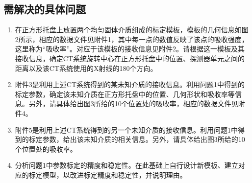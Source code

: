 \documentclass[UTF8]{ctexart}
\begin{document}
\subsection{需解决的具体问题}
\begin{enumerate}
\item 在正方形托盘上放置两个均匀固体介质组成的标定模板，模板的几何信息如图2所示，相应的数据文件见附件1，其中每一点的数值反映了该点的吸收强度，这里称为“吸收率”。对应于该模板的接收信息见附件2。请根据这一模板及其接收信息，确定CT系统旋转中心在正方形托盘中的位置、探测器单元之间的距离以及该CT系统使用的X射线的180个方向。
\item 附件3是利用上述CT系统得到的某未知介质的接收信息。利用问题1中得到的标定参数，确定该未知介质在正方形托盘中的位置、几何形状和吸收率等信息。另外，请具体给出图3所给的10个位置处的吸收率，相应的数据文件见附件4。
\item 附件5是利用上述CT系统得到的另一个未知介质的接收信息。利用问题1中得到的标定参数，给出该未知介质的相关信息。另外，请具体给出图3所给的10个位置处的吸收率。
\item 分析问题1中参数标定的精度和稳定性。在此基础上自行设计新模板、建立对应的标定模型，以改进标定精度和稳定性，并说明理由。
\end{enumerate}
\end{document}
